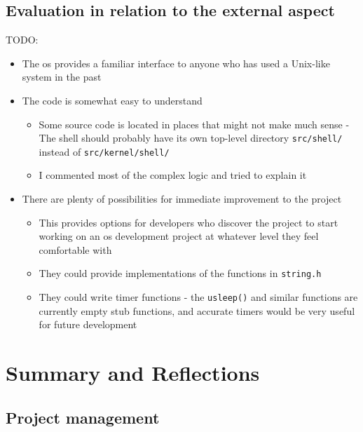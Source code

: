 \documentclass{article}
\begin{document}
\subsection{Evaluation in relation to the external aspect}
TODO:
\begin{itemize}
    \item The \gls{os} provides a familiar interface to anyone who has used a
        Unix-like system in the past
    \item The code is somewhat easy to understand
        \begin{itemize}
            \item Some source code is located in places that might not make
                much sense - The shell should probably have its own top-level
                directory \verb!src/shell/! instead of \verb!src/kernel/shell/!
            \item I commented most of the complex logic and tried to explain it
        \end{itemize}
    \item There are plenty of possibilities for immediate improvement to the
        project
        \begin{itemize}
            \item This provides options for developers who discover the project
                to start working on an \gls{os} development project at whatever
                level they feel comfortable with
            \item They could provide implementations of the functions in
                \verb!string.h!
            \item They could write timer functions - the \verb!usleep()! and
                similar functions are currently empty stub functions, and
                accurate timers would be very useful for future development
        \end{itemize}
\end{itemize}

\section{Summary and Reflections}

\subsection{Project management}
\end{document}
